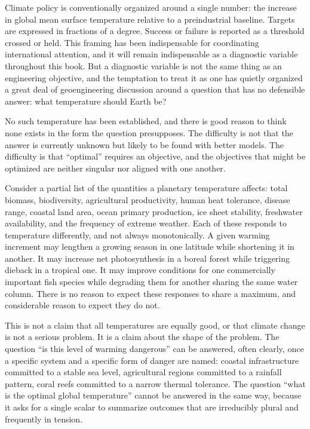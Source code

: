 \documentclass[11pt,oneside]{book}
\begin{document}
Climate policy is conventionally organized around a single number: the increase in global mean surface temperature relative to a preindustrial baseline. Targets are expressed in fractions of a degree. Success or failure is reported as a threshold crossed or held. This framing has been indispensable for coordinating international attention, and it will remain indispensable as a diagnostic variable throughout this book. But a diagnostic variable is not the same thing as an engineering objective, and the temptation to treat it as one has quietly organized a great deal of geoengineering discussion around a question that has no defensible answer: what temperature should Earth be?

No such temperature has been established, and there is good reason to think none exists in the form the question presupposes. The difficulty is not that the answer is currently unknown but likely to be found with better models. The difficulty is that ``optimal'' requires an objective, and the objectives that might be optimized are neither singular nor aligned with one another.

Consider a partial list of the quantities a planetary temperature affects: total biomass, biodiversity, agricultural productivity, human heat tolerance, disease range, coastal land area, ocean primary production, ice sheet stability, freshwater availability, and the frequency of extreme weather. Each of these responds to temperature differently, and not always monotonically. A given warming increment may lengthen a growing season in one latitude while shortening it in another. It may increase net photosynthesis in a boreal forest while triggering dieback in a tropical one. It may improve conditions for one commercially important fish species while degrading them for another sharing the same water column. There is no reason to expect these responses to share a maximum, and considerable reason to expect they do not.

This is not a claim that all temperatures are equally good, or that climate change is not a serious problem. It is a claim about the shape of the problem. The question ``is this level of warming dangerous'' can be answered, often clearly, once a specific system and a specific form of danger are named: coastal infrastructure committed to a stable sea level, agricultural regions committed to a rainfall pattern, coral reefs committed to a narrow thermal tolerance. The question ``what is the optimal global temperature'' cannot be answered in the same way, because it asks for a single scalar to summarize outcomes that are irreducibly plural and frequently in tension.
\end{document}
